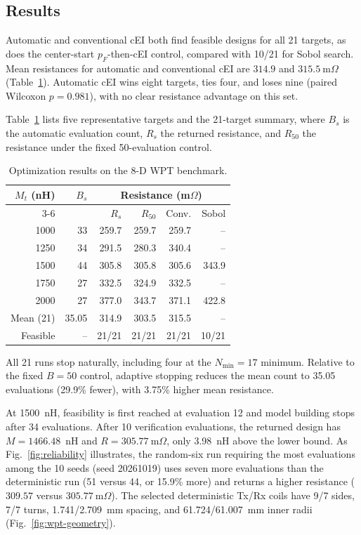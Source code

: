\documentclass[10pt,conference,letterpaper]{IEEEtran}
\begin{document}
\subsection{Results}
Automatic and conventional cEI both find feasible designs for all 21 targets, as does the center-start $p_F$-then-cEI control, compared with 10/21 for Sobol search. Mean resistances for automatic and conventional cEI are $314.9$ and $315.5~\mathrm{m}\Omega$ (Table~\ref{tab:wpt}). Automatic cEI wins eight targets, ties four, and loses nine (paired Wilcoxon $p=0.981$), with no clear resistance advantage on this set.

Table~\ref{tab:wpt} lists five representative targets and the 21-target summary, where $B_s$ is the automatic evaluation count, $R_s$ the returned resistance, and $R_{50}$ the resistance under the fixed 50-evaluation control.

\begin{table}[!t]
\caption{Optimization results on the 8-D WPT benchmark.}
\label{tab:wpt}
\centering
\footnotesize
\begin{tabular}{@{}rrrrrr@{}}
\toprule
$M_t$ (nH) & $B_s$ & \multicolumn{4}{c}{Resistance (m$\Omega$)} \\
\cmidrule(lr){3-6}
& & $R_s$ & $R_{50}$ & Conv. & Sobol \\
\midrule
1000 & 33 & 259.7 & 259.7 & 259.7 & -- \\
1250 & 34 & 291.5 & 280.3 & 340.4 & -- \\
1500 & 44 & 305.8 & 305.8 & 305.6 & 343.9 \\
1750 & 27 & 332.5 & 324.9 & 332.5 & -- \\
2000 & 27 & 377.0 & 343.7 & 371.1 & 422.8 \\
\midrule
Mean (21) & 35.05 & 314.9 & 303.5 & 315.5 & -- \\
Feasible & -- & 21/21 & 21/21 & 21/21 & 10/21 \\
\bottomrule
\end{tabular}
\end{table}

All 21 runs stop naturally, including four at the $N_{\min}=17$ minimum. Relative to the fixed $B=50$ control, adaptive stopping reduces the mean count to 35.05 evaluations (29.9\% fewer), with 3.75\% higher mean resistance.

At 1500~nH, feasibility is first reached at evaluation 12 and model building stops after 34 evaluations. After 10 verification evaluations, the returned design has $M=1466.48$~nH and $R=305.77~\mathrm{m}\Omega$, only 3.98~nH above the lower bound. As Fig.~\ref{fig:reliability} illustrates, the random-six run requiring the most evaluations among the 10 seeds (seed 20261019) uses seven more evaluations than the deterministic run (51 versus 44, or 15.9\% more) and returns a higher resistance ($309.57$ versus $305.77~\mathrm{m}\Omega$). The selected deterministic Tx/Rx coils have 9/7 sides, 7/7 turns, 1.741/2.709~mm spacing, and 61.724/61.007~mm inner radii (Fig.~\ref{fig:wpt-geometry}).
\end{document}
